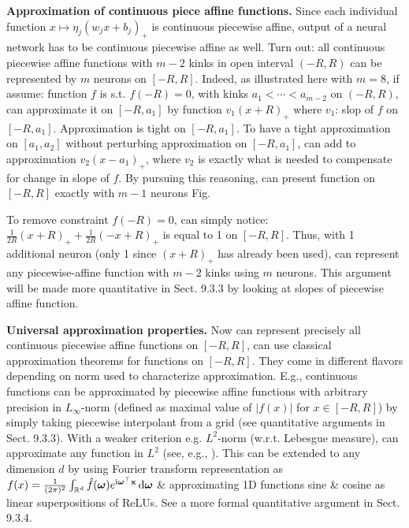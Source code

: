 \documentclass{article}
\begin{document}
\begin{enumerate}
\begin{itemize}
\begin{itemize}
\begin{itemize}
				{\bf Approximation of continuous piece affine functions.} Since each individual function $x\mapsto\eta_j(w_jx + b_j)_+$ is continuous piecewise affine, output of a neural network has to be continuous piecewise affine as well. Turn out: all continuous piecewise affine functions with $m - 2$ kinks in open interval $(-R,R)$ can be represented by $m$ neurons on $[-R,R]$. Indeed, as illustrated here with $m = 8$, if assume: function $f$ is s.t. $f(-R) = 0$, with kinks $a_1 < \cdots < a_{m-2}$ on $(-R,R)$, can approximate it on $[-R,a_1]$ by function $v_1(x + R)_+$ where $v_1$: slop of $f$ on $[-R,a_1]$. Approximation is tight on $[-R,a_1]$. To have a tight approximation on $[a_1,a_2]$ without perturbing approximation on $[-R,a_1]$, can add to approximation $v_2(x - a_1)_+$, where $v_2$ is exactly what is needed to compensate for change in slope of $f$. By pursuing this reasoning, can present function on $[-R,R]$ exactly with $m - 1$ neurons {\sf Fig}.
				
				To remove constraint $f(-R) = 0$, can simply notice: $\frac{1}{2R}(x + R)_+ + \frac{1}{2R}(-x + R)_+$ is equal to 1 on $[-R,R]$. Thus, with 1 additional neuron (only 1 since $(x + R)_+$ has already been used), can represent any piecewise-affine function with $m - 2$ kinks using $m$ neurons. This argument will be made more quantitative in Sect. 9.3.3 by looking at slopes of piecewise affine function.
				
				{\bf Universal approximation properties.} Now can represent precisely all continuous piecewise affine functions on $[-R,R]$, can use classical approximation theorems for functions on $[-R,R]$. They come in different flavors depending on norm used to characterize approximation. E.g., continuous functions can be approximated by piecewise affine functions with arbitrary precision in $L_\infty$-norm (defined as maximal value of $|f(x)|$ for $x\in[-R,R]$) by simply taking piecewise interpolant from a grid (see quantitative arguments in Sect. 9.3.3). With a weaker criterion e.g. $L^2$-norm (w.r.t. Lebesgue measure), can approximate any function in $L^2$ (see, e.g., \cite{Rudin1987}). This can be extended to any dimension $d$ by using Fourier transform representation as $f(x) = \frac{1}{(2\pi)^2}\int_{\mathbb{R}^d} \hat{f}(\boldsymbol{\omega})e^{{\rm i}\boldsymbol{\omega}^\top{\bf x}}\,{\rm d}\boldsymbol{\omega}$ \& approximating 1D functions sine \& cosine as linear superpositions of ReLUs. See a more formal quantitative argument in Sect. 9.3.4.
				

\end{itemize}
\end{itemize}
\end{itemize}
\end{enumerate}
\end{document}
